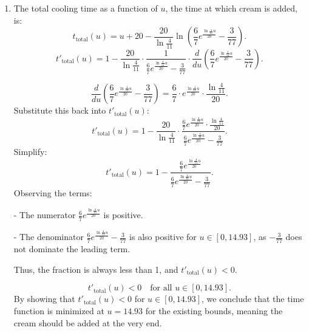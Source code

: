 \documentclass[12pt]{article}
\begin{document}
\begin{enumerate}
\begin{enumerate}
    \item  The total cooling time as a function of \(u\), the time at which cream is added, is:
    \[
    t_{\text{total}}(u) = u + 20 - \frac{20}{\ln\frac{4}{11}} \ln\left(\frac{6}{7}e^{\frac{\ln\frac{4}{11}u}{20}} - \frac{3}{77}\right).
    \]
    \[
t'_{\text{total}}(u) = 1 - \frac{20}{\ln\frac{4}{11}} \cdot \frac{1}{\frac{6}{7}e^{\frac{\ln\frac{4}{11}u}{20}} - \frac{3}{77}} \cdot \frac{d}{du}\left(\frac{6}{7}e^{\frac{\ln\frac{4}{11}u}{20}} - \frac{3}{77}\right).
\]

\[
\frac{d}{du}\left(\frac{6}{7}e^{\frac{\ln\frac{4}{11}u}{20}} - \frac{3}{77}\right) = \frac{6}{7} \cdot e^{\frac{\ln\frac{4}{11}u}{20}} \cdot \frac{\ln\frac{4}{11}}{20}.
\]
Substitute this back into \(t'_{\text{total}}(u)\):
\[
t'_{\text{total}}(u) = 1 - \frac{20}{\ln\frac{4}{11}} \cdot \frac{\frac{6}{7}e^{\frac{\ln\frac{4}{11}u}{20}} \cdot \frac{\ln\frac{4}{11}}{20}}{\frac{6}{7}e^{\frac{\ln\frac{4}{11}u}{20}} - \frac{3}{77}}.
\]
Simplify:
\[
t'_{\text{total}}(u) = 1 - \frac{\frac{6}{7}e^{\frac{\ln\frac{4}{11}u}{20}}}{\frac{6}{7}e^{\frac{\ln\frac{4}{11}u}{20}} - \frac{3}{77}}.
\]
Observing the terms:

- The numerator \(\frac{6}{7}e^{\frac{\ln\frac{4}{11}u}{20}}\) is positive.

- The denominator \(\frac{6}{7}e^{\frac{\ln\frac{4}{11}u}{20}} - \frac{3}{77}\) is also positive for \(u \in [0, 14.93]\), as \(-\frac{3}{77}\) does not dominate the leading term.

Thus, the fraction is always less than 1, and \(t'_{\text{total}}(u) < 0\).

\[
t'_{\text{total}}(u) < 0 \quad \text{for all } u \in [0, 14.93].
\]
    By showing that \(t'_{\text{total}}(u) < 0\) for \(u \in [0, 14.93]\), we conclude that the time function is minimized at \(u = 14.93\) for the existing bounds, meaning the cream should be added at the very end.
\end{enumerate}



\end{enumerate}
\end{document}
